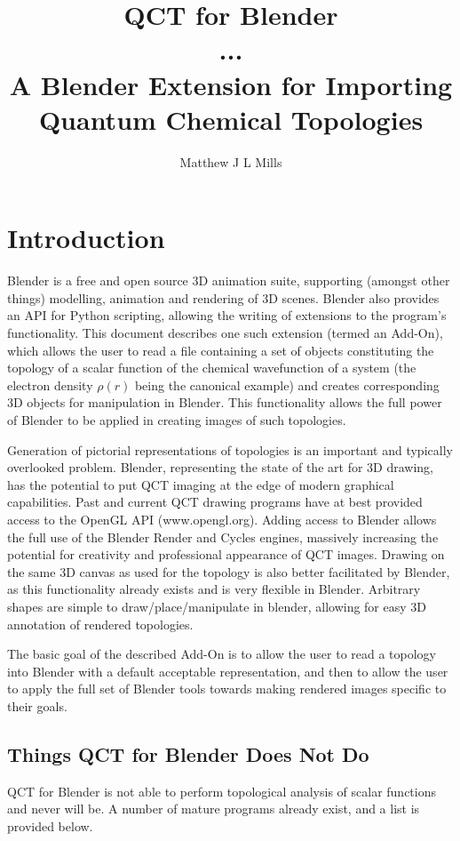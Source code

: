 \documentclass{report}
\title{QCT for Blender \\
       \large ... \\ 
       A Blender Extension for Importing Quantum Chemical Topologies}
\author{Matthew J L Mills}
\begin{document}
\maketitle

\chapter{Introduction}

Blender is a free and open source 3D animation suite, supporting (amongst other things) modelling, animation and 
rendering of 3D scenes. 
Blender also provides an API for Python scripting, allowing the writing of extensions to the program's functionality.
This document describes one such extension (termed an Add-On), which allows the user to read a file containing a set 
of objects constituting the topology of a scalar function of the chemical wavefunction of a system (the electron 
density $\rho(r)$ being the canonical example) and creates corresponding 3D objects for manipulation in Blender.
This functionality allows the full power of Blender to be applied in creating images of such topologies.

Generation of pictorial representations of topologies is an important and typically overlooked problem.
Blender, representing the state of the art for 3D drawing, has the potential to put QCT imaging at the edge 
of modern graphical capabilities.
Past and current QCT drawing programs have at best provided access to the OpenGL API (www.opengl.org).
Adding access to Blender allows the full use of the Blender Render and Cycles engines, massively increasing the 
potential for creativity and professional appearance of QCT images.
Drawing on the same 3D canvas as used for the topology is also better facilitated by Blender, as this functionality
already exists and is very flexible in Blender.
Arbitrary shapes are simple to draw/place/manipulate in blender, allowing for easy 3D annotation of rendered 
topologies.

The basic goal of the described Add-On is to allow the user to read a topology into Blender with a default 
acceptable representation, and then to allow the user to apply the full set of Blender tools towards making 
rendered images specific to their goals.

\section{Things QCT for Blender Does Not Do}

QCT for Blender is not able to perform topological analysis of scalar functions and never will be.
A number of mature programs already exist, and a list is provided below.
\end{document}

